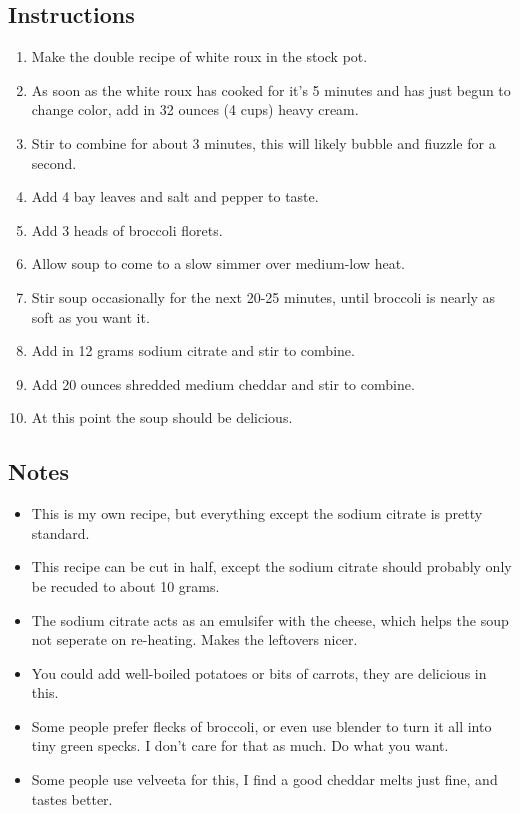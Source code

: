 \begin{multicols}{2}
\subsection*{Instructions}
\begin{enumerate}
    \item Make the double recipe of white roux in the stock pot.
    \item As soon as the white roux has cooked for it's 5 minutes and has just begun to change color, add in 32 ounces (4 cups) heavy cream.
    \item Stir to combine for about 3 minutes, this will likely bubble and fiuzzle for a second.
    \item Add 4 bay leaves and salt and pepper to taste.
    \item Add 3 heads of broccoli florets.
    \item Allow soup to come to a slow simmer over medium-low heat.
    \item Stir soup occasionally for the next 20-25 minutes, until broccoli is nearly as soft as you want it.
    \item Add in 12 grams sodium citrate and stir to combine.
    \item Add 20 ounces shredded medium cheddar and stir to combine.
    \item At this point the soup should be delicious.
\end{enumerate}

\subsection*{Notes}
\begin{itemize}
    \item This is my own recipe, but everything except the sodium citrate is pretty standard.
    \item This recipe can be cut in half, except the sodium citrate should probably only be recuded to about 10 grams.
    \item The sodium citrate acts as an emulsifer with the cheese, which helps the soup not seperate on re-heating. Makes the leftovers nicer.
    \item You could add well-boiled potatoes or bits of carrots, they are delicious in this.
    \item Some people prefer flecks of broccoli, or even use blender to turn it all into tiny green specks. I don't care for that as much. Do what you want.
    \item Some people use velveeta for this, I find a good cheddar melts just fine, and tastes better.
\end{itemize}
\end{multicols}
\clearpage
